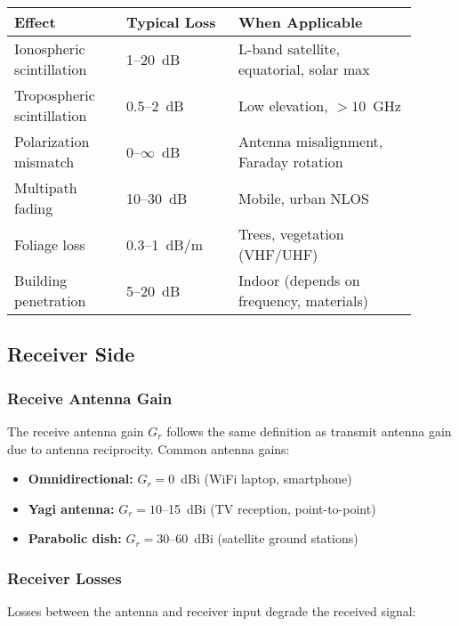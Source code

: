 \begin{center}
\begin{tabular}{@{}p{0.25\linewidth}p{0.25\linewidth}p{0.40\linewidth}@{}}
\toprule
\textbf{Effect} & \textbf{Typical Loss} & \textbf{When Applicable} \\
\midrule
Ionospheric scintillation & 1--20~dB & L-band satellite, equatorial, solar max \\
Tropospheric scintillation & 0.5--2~dB & Low elevation, $> 10$~GHz \\
Polarization mismatch & 0--$\infty$~dB & Antenna misalignment, Faraday rotation \\
Multipath fading & 10--30~dB & Mobile, urban NLOS \\
Foliage loss & 0.3--1~dB/m & Trees, vegetation (VHF/UHF) \\
Building penetration & 5--20~dB & Indoor (depends on frequency, materials) \\
\bottomrule
\end{tabular}
\end{center}

\subsection{Receiver Side}

\subsubsection{Receive Antenna Gain}

The receive antenna gain $G_r$ follows the same definition as transmit antenna gain due to antenna reciprocity. Common antenna gains:

\begin{itemize}
\item \textbf{Omnidirectional:} $G_r = 0$~dBi (WiFi laptop, smartphone)
\item \textbf{Yagi antenna:} $G_r = 10$--15~dBi (TV reception, point-to-point)
\item \textbf{Parabolic dish:} $G_r = 30$--60~dBi (satellite ground stations)
\end{itemize}

\subsubsection{Receiver Losses}

Losses between the antenna and receiver input degrade the received signal:

